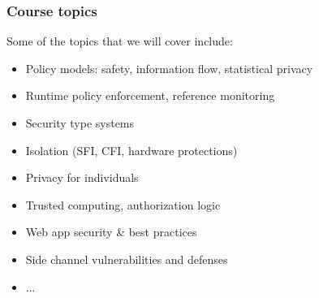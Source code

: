 \documentclass[10pt]{beamer}
\begin{document}








\begin{frame}

\frametitle{Course topics}

Some of the topics that we will cover include:
\begin{itemize}
  \item Policy models: safety, information flow, statistical privacy
  \item Runtime policy enforcement, reference monitoring
  \item Security type systems
  \item Isolation (SFI, CFI, hardware protections)
  \item Privacy for individuals
  \item Trusted computing, authorization logic
  \item Web app security \& best practices
  \item Side channel vulnerabilities and defenses
  \item ...
\end{itemize}

\end{frame}
\end{document}
